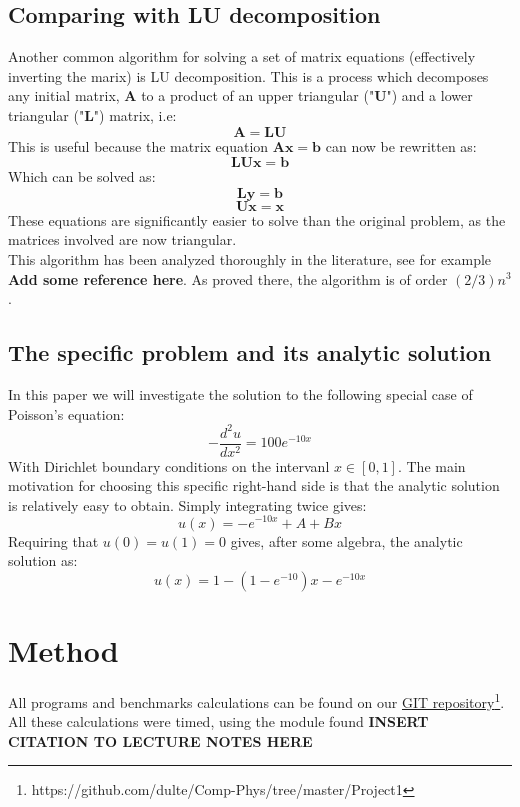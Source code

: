 \documentclass[a4paper, 10pt]{article}
\begin{document}
\subsection{Comparing with LU decomposition}
Another common algorithm for solving a set of matrix equations (effectively inverting the marix) is LU decomposition. This is a process which decomposes any initial matrix, $\mathbf{A}$ to a product of an upper triangular ("$\mathbf{U}$") and a lower triangular ("$\mathbf{L}$") matrix, i.e:
\begin{equation}
\mathbf{A}=\mathbf{L}\mathbf{U}
\end{equation}
This is useful because the matrix equation $\mathbf{A}\mathbf{x}=\mathbf{b}$ can now be rewritten as:
$$\mathbf{L}\mathbf{U}\mathbf{x}=\mathbf{b}$$
Which can be solved as:\\
\begin{equation}\label{eq:LU_1}
\mathbf{L}\mathbf{y}=\mathbf{b}
\end{equation}
\begin{equation}\label{eq:LU_2}
\mathbf{Ux}=\mathbf{x}
\end{equation} These equations are significantly easier to solve than the original problem, as the matrices involved are now triangular.\\
\linebreak This algorithm has been analyzed thoroughly in the literature, see for example \textbf{Add some reference here}. As proved there, the algorithm is of order $(2/3)n^3$. 
\subsection{The specific problem and its analytic solution} \label{analytic_solution}
In this paper we will investigate the solution to the following special case of Poisson's equation:
\begin{equation}\label{eq:poisson_rhs}
-\frac{d^2 u}{dx^2}=100e^{-10x}
\end{equation}
With Dirichlet boundary conditions on the intervanl $x\in [0, 1]$. The main motivation for choosing this specific right-hand side is that the analytic solution is relatively easy to obtain. Simply integrating twice gives:
$$u(x)=-e^{-10x}+A+Bx$$
Requiring that $u(0)=u(1)=0$ gives, after some algebra, the analytic solution as:
\begin{equation}\label{eq:analytic_solution}
u(x)=1-(1-e^{-10})x-e^{-10x}
\end{equation}
\section{Method}\label{Method}
All programs and benchmarks calculations can be found on our \href{https://github.com/dulte/Comp-Phys/tree/master/Project1}{GIT repository}\footnote{https://github.com/dulte/Comp-Phys/tree/master/Project1}. All these calculations were timed, using the module found \textbf{INSERT CITATION TO LECTURE NOTES HERE}
\end{document}
